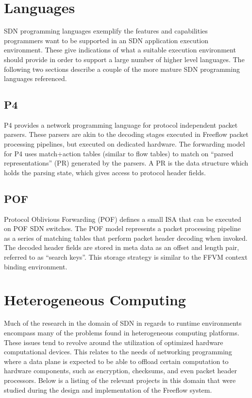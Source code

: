 \section{Languages}
\label{related:lang}
SDN programming languages exemplify the features and capabilities programmers
want to be supported in an SDN application execution environment. These give
indications of what a suitable execution environment should provide in order
to support a large number of higher level languages. The following two sections
describe a couple of the more mature SDN programming languages referenced.

\subsection{P4}
\label{related:p4}
P4 \cite{p4} provides a network programming language for protocol independent
packet parsers. These parsers are akin to the decoding stages executed in
Freeflow packet processing pipelines, but executed on dedicated hardware. The
forwarding model for P4 uses match+action tables (similar to flow tables) to
match on ``parsed representations'' (PR) generated by the parsers. A PR is the
data structure which holds the parsing state, which gives access to protocol
header fields.

\subsection{POF}
\label{related:pof}
Protocol Oblivious Forwarding (POF) \cite{pof} defines a small ISA that can
be executed on POF SDN switches. The POF model represents a packet processing
pipeline as a series of matching tables that perform packet header decoding
when invoked. The decoded header fields are stored in meta data as an offset
and length pair, referred to as ``search keys''. This storage strategy is
similar to the FFVM context binding environment.

\section{Heterogeneous Computing}
\label{related:hcp}
Much of the research in the domain of SDN in regards to runtime environments
encompass many of the problems found in heterogeneous computing platforms.
These issues tend to revolve around the utilization of optimized hardware
computational devices. This relates to the needs of networking programming
where a data plane is expected to be able to offload certain computation to
hardware components, such as encryption, checksums, and even packet header
processors. Below is a listing of the relevant projects in this domain that
were studied during the design and implementation of the Freeflow system.

